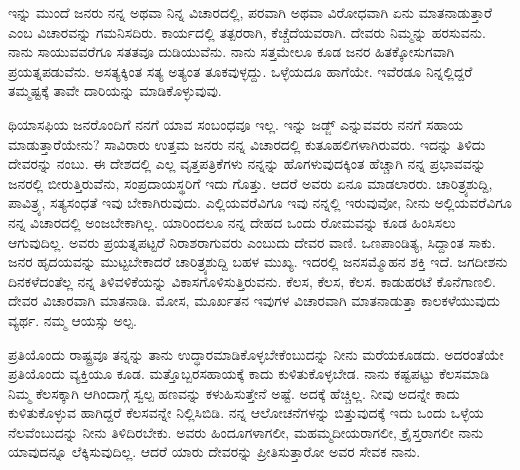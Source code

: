 ಇನ್ನು ಮುಂದೆ ಜನರು ನನ್ನ ಅಥವಾ ನಿನ್ನ ವಿಚಾರದಲ್ಲಿ, ಪರವಾಗಿ ಅಥವಾ ವಿರೋಧವಾಗಿ ಏನು ಮಾತನಾಡುತ್ತಾರೆ ಎಂಬ ವಿಚಾರವನ್ನು ಗಮನಿಸದಿರು. ಕಾರ್ಯದಲ್ಲಿ ತತ್ಪರರಾಗಿ, ಕೆಚ್ಚೆದೆಯವರಾಗಿ. ದೇವರು ನಿಮ್ಮನ್ನು ಹರಸುವನು. ನಾನು ಸಾಯುವವರೆಗೂ ಸತತವೂ ದುಡಿಯುವೆನು. ನಾನು ಸತ್ತಮೇಲೂ ಕೂಡ ಜನರ ಹಿತಕ್ಕೋಸುಗವಾಗಿ ಪ್ರಯತ್ನಪಡುವೆನು. ಅಸತ್ಯಕ್ಕಿಂತ ಸತ್ಯ ಅತ್ಯಂತ ತೂಕವುಳ್ಳದ್ದು. ಒಳ್ಳೆಯದೂ ಹಾಗೆಯೇ. ಇವೆರಡೂ ನಿನ್ನಲ್ಲಿದ್ದರೆ ತಮ್ಮಷ್ಟಕ್ಕೆ ತಾವೇ ದಾರಿಯನ್ನು ಮಾಡಿಕೊಳ್ಳುವುವು.

ಥಿಯಾಸಫಿಯ ಜನರೊಂದಿಗೆ ನನಗೆ ಯಾವ ಸಂಬಂಧವೂ ಇಲ್ಲ. ಇನ್ನು ಜಡ್ಜ್ ಎನ್ನುವವರು ನನಗೆ ಸಹಾಯ ಮಾಡುತ್ತಾರೆಯೇನು? ಸಾವಿರಾರು ಉತ್ತಮ ಜನರು ನನ್ನ ವಿಚಾರದಲ್ಲಿ ಕುತೂಹಲಿಗಳಾಗಿರುವರು. ಇದನ್ನು ತಿಳಿದು ದೇವರನ್ನು ನಂಬು. ಈ ದೇಶದಲ್ಲಿ ಎಲ್ಲ ವೃತ್ತಪತ್ರಿಕೆಗಳು ನನ್ನನ್ನು ಹೊಗಳುವುದಕ್ಕಿಂತ ಹೆಚ್ಚಾಗಿ ನನ್ನ ಪ್ರಭಾವವನ್ನು ಜನರಲ್ಲಿ ಬೀರುತ್ತಿರುವೆನು, ಸಂಪ್ರದಾಯಸ್ಥರಿಗೆ ಇದು ಗೊತ್ತು. ಆದರೆ ಅವರು ಏನೂ ಮಾಡಲಾರರು. ಚಾರಿತ್ರ್ಯಶುದ್ದಿ, ಪಾವಿತ್ರ್ಯ, ಸತ್ಯಸಂಧತೆ ಇವು ಬೇಕಾಗಿರುವುದು. ಎಲ್ಲಿಯವರೆವಿಗೂ ಇವು ನನ್ನಲ್ಲಿ ಇರುವುವೋ, ನೀನು ಅಲ್ಲಿಯವರೆವಿಗೂ ನನ್ನ ವಿಚಾರದಲ್ಲಿ ಅಂಜಬೇಕಾಗಿಲ್ಲ. ಯಾರಿಂದಲೂ ನನ್ನ ದೇಹದ ಒಂದು ರೋಮವನ್ನು ಕೂಡ ಹಿಂಸಿಸಲು ಆಗುವುದಿಲ್ಲ. ಅವರು ಪ್ರಯತ್ನಪಟ್ಟರೆ ನಿರಾಶರಾಗುವರು ಎಂಬುದು ದೇವರ ವಾಣಿ. ಒಣಪಾಂಡಿತ್ಯ, ಸಿದ್ದಾಂತ ಸಾಕು. ಜನರ ಹೃದಯವನ್ನು ಮುಟ್ಟಬೇಕಾದರೆ ಚಾರಿತ್ರ್ಯಶುದ್ದಿ ಬಹಳ ಮುಖ್ಯ. ಇದರಲ್ಲಿ ಜನಸಮ್ಮೊಹನ ಶಕ್ತಿ ಇದೆ. ಜಗದೀಶನು ದಿನಕಳೆದಂತೆಲ್ಲ ನನ್ನ ತಿಳಿವಳಿಕೆಯನ್ನು ವಿಕಾಸಗೊಳಿಸುತ್ತಿರುವನು. ಕೆಲಸ, ಕೆಲಸ, ಕೆಲಸ. ಕಾಡುಹರಟೆ ಕೊನೆಗಾಣಲಿ. ದೇವರ ವಿಚಾರವಾಗಿ ಮಾತನಾಡಿ. ಮೋಸ, ಮೂರ್ಖತನ ಇವುಗಳ ವಿಚಾರವಾಗಿ ಮಾತನಾಡುತ್ತಾ ಕಾಲಕಳೆಯುವುದು ವ್ಯರ್ಥ. ನಮ್ಮ ಆಯಸ್ಸು ಅಲ್ಪ.

ಪ್ರತಿಯೊಂದು ರಾಷ್ಟ್ರವೂ ತನ್ನನ್ನು ತಾನು ಉದ್ಧಾರಮಾಡಿಕೊಳ್ಳಬೇಕೆಂಬುದನ್ನು ನೀನು ಮರೆಯಕೂಡದು. ಅದರಂತೆಯೇ ಪ್ರತಿಯೊಂದು ವ್ಯಕ್ತಿಯೂ ಕೂಡ. ಮತ್ತೊಬ್ಬರ\break ಸಹಾಯಕ್ಕೆ ಕಾದು ಕುಳಿತುಕೊಳ್ಳಬೇಡ. ನಾನು ಕಷ್ಟಪಟ್ಟು ಕೆಲಸಮಾಡಿ ನಿಮ್ಮ ಕೆಲಸಕ್ಕಾಗಿ ಆಗಿಂದಾಗ್ಗೆ ಸ್ವಲ್ಪ ಹಣವನ್ನು ಕಳುಹಿಸುತ್ತೇನೆ ಅಷ್ಟೆ. ಅದಕ್ಕೆ ಹೆಚ್ಚಿಲ್ಲ. ನೀವು ಅದನ್ನೇ ಕಾದು ಕುಳಿತುಕೊಳ್ಳುವ ಹಾಗಿದ್ದರೆ ಕೆಲಸವನ್ನೇ ನಿಲ್ಲಿಸಿಬಿಡಿ. ನನ್ನ ಆಲೋಚನೆಗಳನ್ನು ಬಿತ್ತುವುದಕ್ಕೆ ಇದು ಒಂದು ಒಳ್ಳೆಯ ನೆಲವೆಂಬುದನ್ನು ನೀನು ತಿಳಿದಿರಬೇಕು. ಅವರು ಹಿಂದೂಗಳಾಗಲೀ, ಮಹಮ್ಮದೀಯರಾಗಲೀ, ಕ್ರೈಸ್ತರಾಗಲೀ ನಾನು ಯಾವುದನ್ನೂ ಲೆಕ್ಕಿಸುವುದಿಲ್ಲ. ಆದರೆ ಯಾರು ದೇವರನ್ನು ಪ್ರೀತಿಸುತ್ತಾರೋ ಅವರ ಸೇವಕ ನಾನು.

